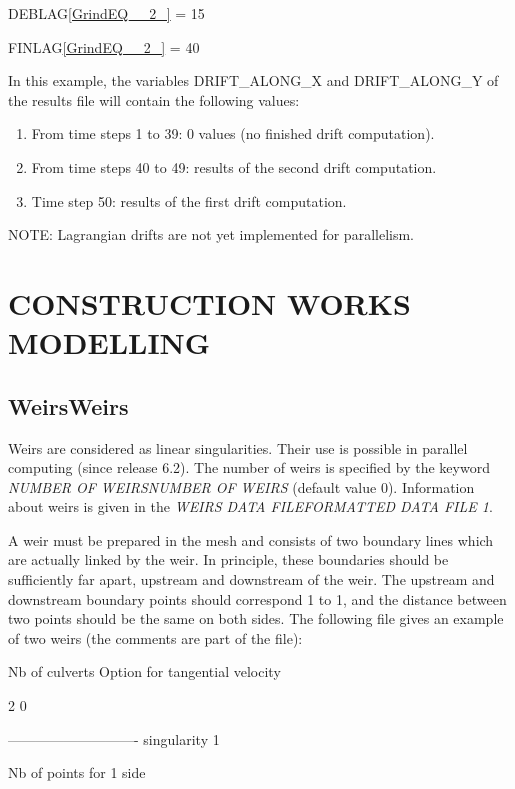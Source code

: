 \documentclass{article} %
\begin{document}
   DEBLAG\eqref{GrindEQ__2_} = 15

   FINLAG\eqref{GrindEQ__2_} = 40

 In this example, the variables DRIFT\_ALONG\_X and DRIFT\_ALONG\_Y of the results file will contain the following values:

\begin{enumerate}
\item  From time steps 1 to 39: 0 values (no finished drift computation).

\item  From time steps 40 to 49: results of the second drift computation.

\item  Time step 50: results of the first drift computation.
\end{enumerate}



 NOTE: Lagrangian drifts are not yet implemented for parallelism.


\section{  CONSTRUCTION WORKS MODELLING}


\subsection{ WeirsWeirs}

 Weirs are considered as linear singularities. Their use is possible in parallel computing (since release 6.2). The number of weirs is specified by the keyword \textit{NUMBER OF WEIRSNUMBER OF WEIRS} (default value 0). Information about weirs is given in the \textit{WEIRS DATA FILEFORMATTED DATA FILE 1}.

 A weir must be prepared in the mesh and consists of two boundary lines which are actually linked by the weir. In principle, these boundaries should be sufficiently far apart, upstream and downstream of the weir. The upstream and downstream boundary points should correspond 1 to 1, and the distance between two points should be the same on both sides. The following file gives an example of two weirs (the comments are part of the file):

 Nb of culverts  Option for tangential velocity

       2                    0

 ---------------------------- singularity 1

 Nb of points for 1 side
\end{document}
